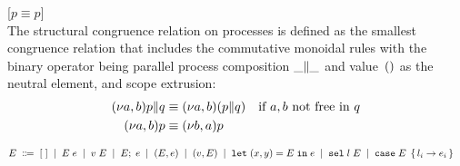 [$p \equiv p$]\medskip\\
The structural congruence relation on processes is defined as the smallest
congruence relation that includes the commutative monoidal rules with the
binary operator being parallel process composition $\PPar \_ \_$ and
value~$()$ as the neutral element, and scope extrusion:
\begin{align*}
  \PPar{\PScope p}{q} &\equiv \PScope (\PPar p q)
  \quad\text{if $a,b$ not free in $q$}
  \\
  \PScope p &\equiv \PScope[b,a] p
\end{align*}

\begin{align*}
  E \; \Coloneqq \;\;&
    [\;] \; \mid \;
    E \; e \; \mid \;
    v \; E \; \mid \;
    E;\; e \; \mid \;
    (E,e) \; \mid \;
    (v,E) \; \mid \;
    \mathtt{let}\; (x,y) = E \;\mathtt{in}\; e \; \mid \;
    \mathtt{sel}\; l \; E \; \mid \; 
    \mathtt{case}\; E \; \left\{\,  l_i \rightarrow e_i  \,\right\}
\end{align*}



% 

